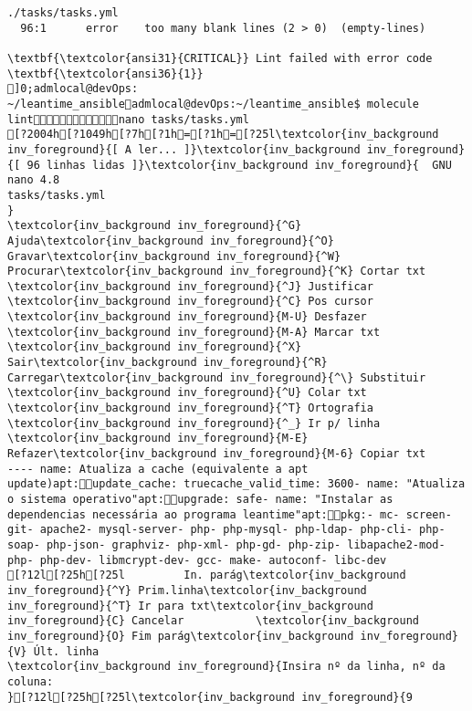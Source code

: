 \documentclass{scrartcl}
\begin{document}
\begin{Verbatim}
./tasks/tasks.yml
  96:1      error    too many blank lines (2 > 0)  (empty-lines)

\textbf{\textcolor{ansi31}{CRITICAL}} Lint failed with error code \textbf{\textcolor{ansi36}{1}}
]0;admlocal@devOps: ~/leantime_ansibleadmlocal@devOps:~/leantime_ansible$ molecule lintnano tasks/tasks.yml 
[?2004h[?1049h[?7h[?1h=[?1h=[?25l\textcolor{inv_background inv_foreground}{[ A ler... ]}\textcolor{inv_background inv_foreground}{[ 96 linhas lidas ]}\textcolor{inv_background inv_foreground}{  GNU nano 4.8                                                tasks/tasks.yml                                                             }
\textcolor{inv_background inv_foreground}{^G} Ajuda\textcolor{inv_background inv_foreground}{^O} Gravar\textcolor{inv_background inv_foreground}{^W} Procurar\textcolor{inv_background inv_foreground}{^K} Cortar txt    \textcolor{inv_background inv_foreground}{^J} Justificar    \textcolor{inv_background inv_foreground}{^C} Pos cursor    \textcolor{inv_background inv_foreground}{M-U} Desfazer     \textcolor{inv_background inv_foreground}{M-A} Marcar txt
\textcolor{inv_background inv_foreground}{^X} Sair\textcolor{inv_background inv_foreground}{^R} Carregar\textcolor{inv_background inv_foreground}{^\} Substituir    \textcolor{inv_background inv_foreground}{^U} Colar txt     \textcolor{inv_background inv_foreground}{^T} Ortografia    \textcolor{inv_background inv_foreground}{^_} Ir p/ linha   \textcolor{inv_background inv_foreground}{M-E} Refazer\textcolor{inv_background inv_foreground}{M-6} Copiar txt
---- name: Atualiza a cache (equivalente a apt update)apt:update_cache: truecache_valid_time: 3600- name: "Atualiza o sistema operativo"apt:upgrade: safe- name: "Instalar as dependencias necessária ao programa leantime"apt:pkg:- mc- screen- git- apache2- mysql-server- php- php-mysql- php-ldap- php-cli- php-soap- php-json- graphviz- php-xml- php-gd- php-zip- libapache2-mod-php- php-dev- libmcrypt-dev- gcc- make- autoconf- libc-dev
[?12l[?25h[?25l         In. parág\textcolor{inv_background inv_foreground}{^Y} Prim.linha\textcolor{inv_background inv_foreground}{^T} Ir para txt\textcolor{inv_background inv_foreground}{C} Cancelar           \textcolor{inv_background inv_foreground}{O} Fim parág\textcolor{inv_background inv_foreground}{V} Últ. linha
\textcolor{inv_background inv_foreground}{Insira nº da linha, nº da coluna:                                                                                                         }[?12l[?25h[?25l\textcolor{inv_background inv_foreground}{9

\end{Verbatim}
\end{document}

